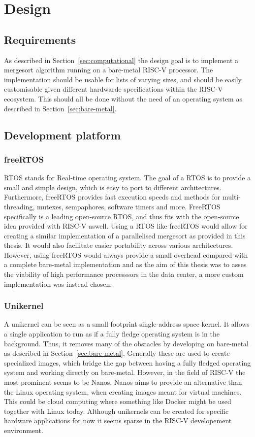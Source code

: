 \section{Design}\label{sec:Design}
\subsection{Requirements}
As described in Section~\ref{sec:computational} the design goal is to implement
a mergesort algorithm running on a bare-metal RISC-V processor. The
implementation should be usable for lists of varying sizes, and should be easily
customisable given different hardwarde specifications within the RISC-V
ecosystem. This should all be done without the need of an operating system as
described in Section~\ref{sec:bare-metal}.

\subsection{Development platform}
\subsubsection{freeRTOS}
RTOS stands for Real-time operating system. The goal of a RTOS is to provide a
small and simple design, which is easy to port to different architectures.
Furthermore, freeRTOS provides fast execution speeds and methods for
multi-threading, mutexes, sempaphores, software timers and more. FreeRTOS
specifically is a leading open-source RTOS, and thus fits with the open-source
idea provided with RISC-V aswell. Using a RTOS like freeRTOS would allow for
creating a similar implementation of a parallelised mergesort as provided in
this thesis. It would also facilitate easier portability across various
architectures. However, using freeRTOS would always provide a small overhead
compared with a complete bare-metal implementation and as the aim of this thesis
was to asses the viability of high performance processsors in the data center, a
more custom implementation was instead chosen.

\subsubsection{Unikernel}
A unikernel can be seen as a small footprint single-address space kernel. It
allows a single application to run as if a fully fledge operating system is in
the background. Thus, it removes many of the obstacles by developing on
bare-metal as described in Section~\ref{sec:bare-metal}. Generally these are
used to create specialized images, which bridge the gap between having a fully
fledged operating system and working directly on bare-metal. However, in the
field of RISC-V the most prominent seems to be Nanos. Nanos aims to provide an
alternative than the Linux operating system, when creating images meant for
virtual machines. This could be cloud computing where something like Docker
might be used together with Linux today. Although unikernels can be created for
specific hardware applications for now it seems sparse in the RISC-V
developement environment.

